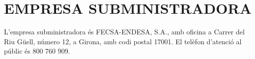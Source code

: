 \chapter{\uppercase{Empresa subministradora}}
L'empresa subministradora és FECSA-ENDESA, S.A., amb oficina a Carrer del Riu Güell, número 12, a Girona, amb codi postal 17001. El telèfon d'atenció al públic és 800 760 909.
\clearpage